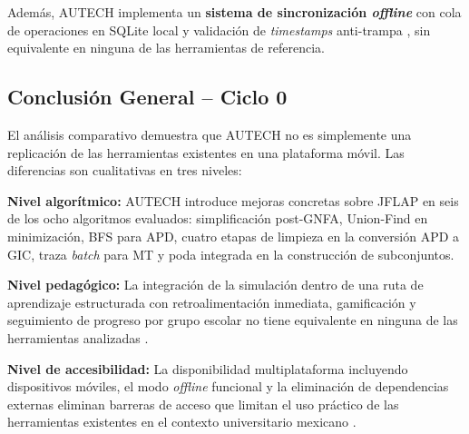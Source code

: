 Además, AUTECH implementa un \textbf{sistema de sincronización \textit{offline}} con cola de
operaciones en SQLite local y validación de \textit{timestamps} anti-trampa \cite{supabase2024},
sin equivalente en ninguna de las herramientas de referencia.

\newpage
\subsection{Conclusión General -- Ciclo 0}
\label{subsec:conclusion_general}

El análisis comparativo demuestra que AUTECH no es simplemente una replicación de las herramientas
existentes en una plataforma móvil. Las diferencias son cualitativas en tres niveles:

\textbf{Nivel algorítmico:} AUTECH introduce mejoras concretas sobre JFLAP en seis de los ocho
algoritmos evaluados: simplificación post-GNFA, Union-Find en minimización, BFS para APD, cuatro
etapas de limpieza en la conversión APD a GIC, traza \textit{batch} para MT y poda integrada en la
construcción de subconjuntos.

\textbf{Nivel pedagógico:} La integración de la simulación dentro de una ruta de aprendizaje
estructurada con retroalimentación inmediata, gamificación y seguimiento de progreso por grupo
escolar no tiene equivalente en ninguna de las herramientas analizadas
\cite{deterding2011}\cite{felder2016}\cite{sweller1988}.

\textbf{Nivel de accesibilidad:} La disponibilidad multiplataforma incluyendo dispositivos móviles,
el modo \textit{offline} funcional y la eliminación de dependencias externas eliminan barreras de
acceso que limitan el uso práctico de las herramientas existentes en el contexto universitario
mexicano \cite{crompton2018}\cite{kukulska2007}.
